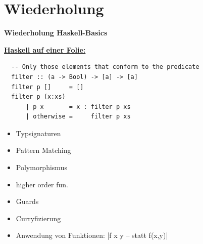 \documentclass[unknownkeysallowed]{beamer}
\begin{document}

\section{Wiederholung}
\begin{frame}
\begin{center}
\Large\textbf{Wiederholung Haskell-Basics}
\end{center}
\end{frame}

  
  \begin{frame}[fragile]
  
  \Large\textbf{\underline{Haskell auf einer Folie:}} \bigskip \normalsize

  \begin{verbatim}
  -- Only those elements that conform to the predicate
  filter :: (a -> Bool) -> [a] -> [a]
  filter p []     = []
  filter p (x:xs) 
      | p x       = x : filter p xs
      | otherwise =     filter p xs
  \end{verbatim}
  
  \pause
  
  \begin{multicols}{2}
  \begin{itemize}
  \item Typsignaturen    \pause
  \item Pattern Matching \pause
  \item Polymorphismus   \pause
  \end{itemize}
  
  \columnbreak
  
  \begin{itemize}
  \item higher order fun. \pause
  \item Guards            \pause
  \item Curryfizierung    \pause
  \end{itemize}

  \end{multicols}
  

  \begin{itemize}
  \item Anwendung von Funktionen: |f x y -- statt f(x,y)|
  \end{itemize}
  
\end{frame}
\end{document}
